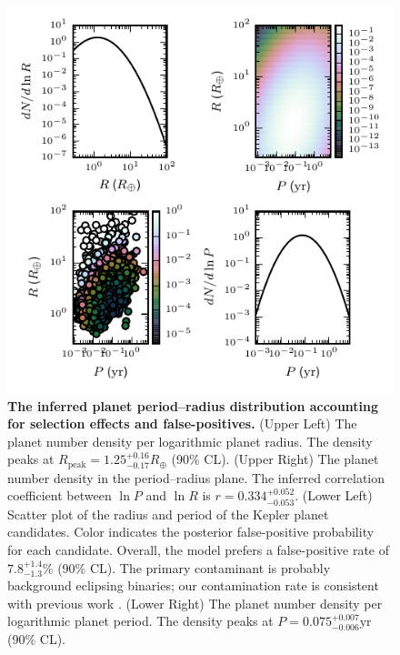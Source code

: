 \documentclass[apjl]{emulateapj}
\newcommand{\Rpeak}{R_\mathrm{peak}}
\newcommand{\REarth}{R_\oplus}
\newcommand{\rpeakrange}{1.25_{-0.17}^{+0.16}}
\newcommand{\corrcoeffrange}{0.334_{-0.053}^{+0.052}}
\newcommand{\fposrange}{7.8_{-1.3}^{+1.4}\%}
\newcommand{\ppeakrange}{0.075_{-0.006}^{+0.007}}
\begin{document}
\begin{figure}
  \includegraphics[width=\columnwidth]{foreground-dist}
  \caption{\label{fig:foreground-dist} \textbf{The inferred planet
      period--radius distribution accounting for selection effects and
      false-positives.}  (Upper Left) The planet number density per
    logarithmic planet radius.  The density peaks at $\Rpeak =
    \rpeakrange \REarth$ (90\% CL).  (Upper Right) The planet number
    density in the period--radius plane.  The inferred correlation
    coefficient between $\ln P$ and $\ln R$ is $r = \corrcoeffrange$.
    (Lower Left) Scatter plot of the radius and period of the Kepler
    planet candidates.  Color indicates the posterior false-positive
    probability for each candidate.  Overall, the model prefers a
    false-positive rate of $\fposrange$ (90\% CL).  The primary
    contaminant is probably background eclipsing binaries; our
    contamination rate is consistent with previous work
    \citep{Fressin2013}. (Lower Right) The planet number density per
    logarithmic planet period.  The density peaks at $P = \ppeakrange
    \mathrm{yr}$ (90\% CL). }
\end{figure}
\end{document}
